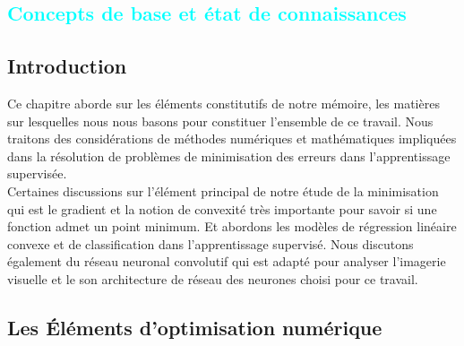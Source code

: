 
%
%

\textcolor{cyan}{\chapter{Concepts de base et état de connaissances}\label{chap:concept}}
	
	\section{Introduction}
	
	Ce chapitre aborde sur les éléments constitutifs de notre mémoire, les matières sur lesquelles nous nous basons pour constituer l'ensemble de ce travail. 
	Nous traitons des considérations de méthodes numériques et mathématiques impliquées dans la résolution de problèmes de minimisation des erreurs dans l'apprentissage supervisée. \\
	Certaines discussions sur l'élément principal de notre étude de la minimisation qui est le gradient et la notion de convexité très importante pour savoir si une fonction admet un point minimum. Et abordons les modèles de régression linéaire convexe et de classification dans l’apprentissage supervisé. Nous discutons également du réseau neuronal convolutif qui est adapté pour analyser l'imagerie visuelle et le son architecture de réseau des neurones choisi pour ce travail.
	
	
	\section{Les Éléments d'optimisation numérique} \label{sec:optimisation}

